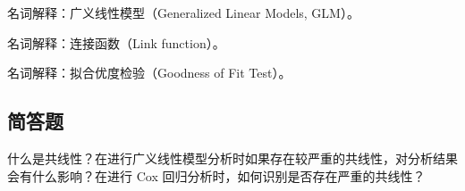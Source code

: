 \par\addvspace{8pt}\noindent\begin{minipage}{\linewidth}


名词解释：广义线性模型（Generalized Linear Models, GLM）。



\end{minipage}\par\vspace{5pt}

\par\addvspace{8pt}\noindent\begin{minipage}{\linewidth}


名词解释：连接函数（Link function）。



\end{minipage}\par\vspace{5pt}

\par\addvspace{8pt}\noindent\begin{minipage}{\linewidth}


名词解释：拟合优度检验（Goodness of Fit Test）。



\end{minipage}\par\vspace{5pt}

\par\addvspace{8pt}\noindent\begin{minipage}{\linewidth}

\subsection{简答题}


什么是共线性？在进行广义线性模型分析时如果存在较严重的共线性，对分析结果会有什么影响？在进行 Cox 回归分析时，如何识别是否存在严重的共线性？



\end{minipage}\par\vspace{5pt}

